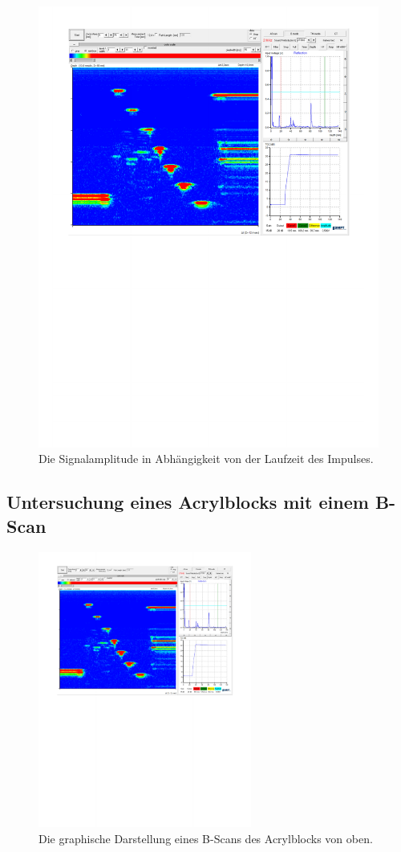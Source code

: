 \begin{figure}[H]
  \centering
  \includegraphics[width = \textwidth]{content/2Mhz.pdf}
  \caption{Die Signalamplitude in Abhängigkeit von der Laufzeit des Impulses.}
  \label{fig:2mhz}
\end{figure}


\subsection{Untersuchung eines Acrylblocks mit einem B-Scan}




\begin{figure}[H]
  \centering
  \includegraphics[width = 7cm]{content/bscan_oben.pdf}
  \caption{Die graphische Darstellung eines B-Scans des Acrylblocks von oben.}
  \label{fig:boben}
\end{figure}

